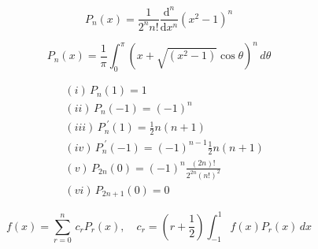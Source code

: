 \[\begin{equation} \label{thrm3.2} P_{n}(x)={\frac{1}{2^{n}n!}}\frac{\mathrm{d}^{n}}{\mathrm{d}x^{n}}(x^{2}-1)^{n} \end{equation}\]

\[\begin{equation} \label{thrm3.3} P_{n}(x) = \frac{1}{\pi}\int_{0}^{\pi}(x + \sqrt{(x^{2}-1)}\cos{\theta})^{n}\,d\theta \end{equation}\]

\[\begin{equation} \label{thrm3.4} {\begin{aligned} & (i)\, P_{n}(1)=1\\\ & (ii)\, P_{n}(-1) = (-1)^{n}\\\ & (iii)\, P_{n}^{\;'}(1) = \frac{1}{2}n(n+1)\\\ & (iv)\, P_{n}^{\;'}(-1) = (-1)^{n-1}\frac{1}{2}n(n+1)\\\ & (v)\, P_{2n}(0) = (-1)^{n}\frac{(2n)!}{2^{2n}(n!)^{2}}\\\ & (vi)\, P_{2n+1}(0) = 0 \end{aligned}} \end{equation}\]

\[\begin{equation} \label{thrm3.6} f(x) = \sum_{r=0}^{n}\, c_rP_r(x),\quad c_r = (r + \frac{1}{2})\int_{-1}^{1}f(x)P_r(x)\, dx \end{equation}\]

